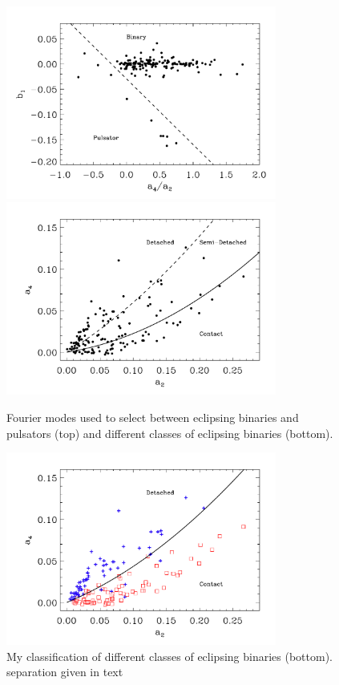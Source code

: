 \documentclass[]{emulateapj}
\begin{document}



\begin{figure}[]
\centering
\includegraphics[width=3.5in]{new_plots/four_a42b1}
\includegraphics[width=3.5in]{new_plots/four_a2a4}
\caption{Fourier modes used to select between eclipsing binaries and pulsators (top) and different classes of eclipsing binaries (bottom).}
\label{four_bb}
\end{figure}


\begin{figure}[]
\centering
\includegraphics[width=3.5in]{new_plots/four_a2a4_jrad}
\caption{My classification of different classes of eclipsing binaries (bottom). separation given in text}
\label{four_bb2}
\end{figure}
\end{document}
